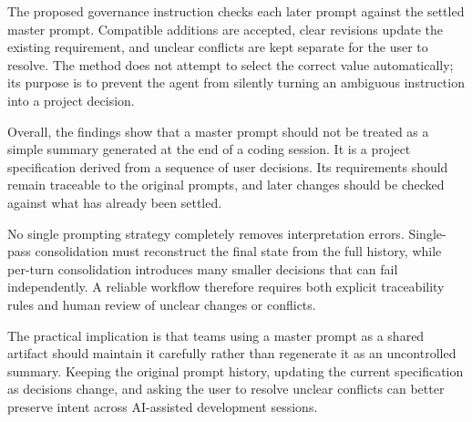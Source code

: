 The proposed governance instruction checks each later prompt against the
settled master prompt. Compatible additions are accepted, clear revisions
update the existing requirement, and unclear conflicts are kept separate for
the user to resolve. The method does not attempt to select the correct value
automatically; its purpose is to prevent the agent from silently turning an
ambiguous instruction into a project decision.

Overall, the findings show that a master prompt should not be treated as a
simple summary generated at the end of a coding session. It is a project
specification derived from a sequence of user decisions. Its requirements
should remain traceable to the original prompts, and later changes should be
checked against what has already been settled.

No single prompting strategy completely removes interpretation errors.
Single-pass consolidation must reconstruct the final state from the full
history, while per-turn consolidation introduces many smaller decisions that
can fail independently. A reliable workflow therefore requires both explicit
traceability rules and human review of unclear changes or conflicts.

The practical implication is that teams using a master prompt as a shared
artifact should maintain it carefully rather than regenerate it as an
uncontrolled summary. Keeping the original prompt history, updating the
current specification as decisions change, and asking the user to resolve
unclear conflicts can better preserve intent across AI-assisted development
sessions.
